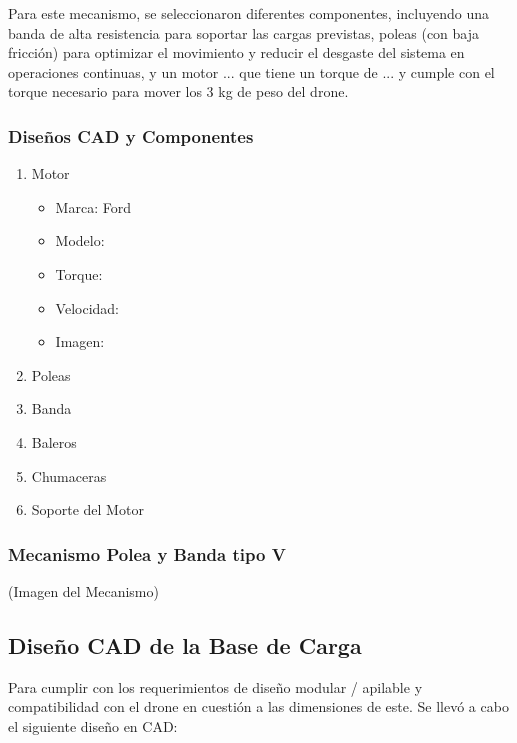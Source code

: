 Para este mecanismo, se seleccionaron diferentes componentes, incluyendo una banda de alta resistencia para soportar las cargas previstas, poleas (con baja fricción) para optimizar el movimiento y reducir el desgaste del sistema en operaciones continuas, y un motor ... que tiene un torque de ... y cumple con el torque necesario para mover los 3 kg de peso del drone.

\subsubsection{Diseños CAD y Componentes}
    \begin{enumerate}
        \item Motor 
            \begin{itemize}
                \item Marca: Ford
                \item Modelo: 
                \item Torque: 
                \item Velocidad: 
                \item Imagen: 
            \end{itemize}
        \item Poleas
        \item Banda
        \item Baleros
        \item Chumaceras 
        \item Soporte del Motor
    \end{enumerate}

\subsubsection{Mecanismo Polea y Banda tipo V}
(Imagen del Mecanismo)

\subsection{Diseño CAD de la Base de Carga}
Para cumplir con los requerimientos de diseño modular / apilable y compatibilidad con el drone en cuestión a las dimensiones de este. Se llevó a cabo el siguiente diseño en CAD:

